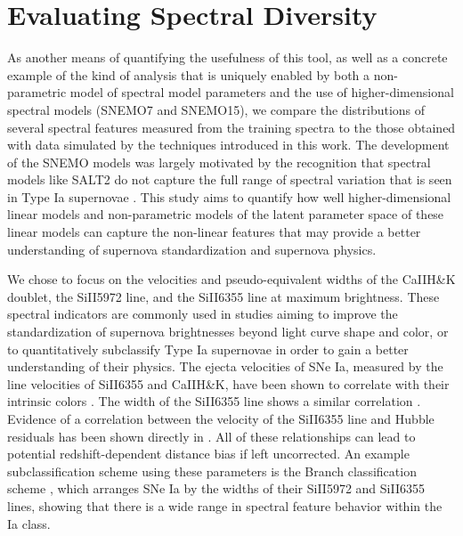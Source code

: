 \section{Evaluating Spectral Diversity}
\label{sec:spec_diversity}
As another means of quantifying the usefulness of this tool, as well as a concrete example of the kind of analysis that is uniquely enabled by both a non-parametric model of spectral model parameters and the use of higher-dimensional spectral models (SNEMO7 and SNEMO15), we compare the distributions of several spectral features measured from the training spectra to the those obtained with data simulated by the techniques introduced in this work. The development of the SNEMO models was largely motivated by the recognition that spectral models like SALT2 do not capture the full range of spectral variation that is seen in Type Ia supernovae \citep{Saunders2018}. This study aims to quantify how well higher-dimensional linear models and non-parametric models of the latent parameter space of these linear models can capture the non-linear features that may provide a better understanding of supernova standardization and supernova physics.

We chose to focus on the velocities and pseudo-equivalent widths of the CaIIH\&K doublet, the SiII5972 line, and the SiII6355 line at maximum brightness. These spectral indicators are commonly used in studies aiming to improve the standardization of supernova brightnesses beyond light curve shape and color, or to quantitatively subclassify Type Ia supernovae in order to gain a better understanding of their physics. The ejecta velocities of SNe Ia, measured by the line velocities of SiII6355 and CaIIH\&K, have been shown to correlate with their intrinsic colors \citep{FoleyKasen2011, FSK2011, Foley2012, Mandel2014}. The width of the SiII6355 line shows a similar correlation \citep{FSK2011}. Evidence of a correlation between the velocity of the SiII6355 line and Hubble residuals has been shown directly in \cite{Siebert2020}. All of these relationships can lead to potential redshift-dependent distance bias if left uncorrected. An example subclassification scheme using these parameters is the Branch classification scheme \citep{Branch2006}, which arranges SNe Ia by the widths of their SiII5972 and SiII6355 lines, showing that there is a wide range in spectral feature behavior within the Ia class. 


